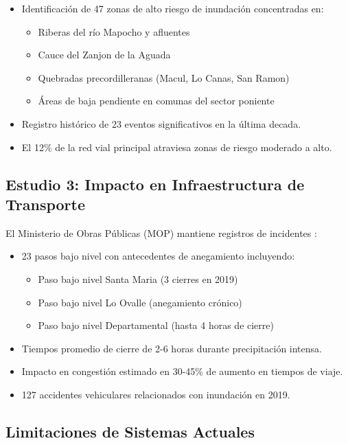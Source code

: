 \documentclass[conference]{IEEEtran}
\begin{document}
\begin{itemize}
    \item Identificación de 47 zonas de alto riesgo de inundación concentradas en:
    \begin{itemize}
        \item Riberas del río Mapocho y afluentes
        \item Cauce del Zanjon de la Aguada
        \item Quebradas precordilleranas (Macul, Lo Canas, San Ramon)
        \item Áreas de baja pendiente en comunas del sector poniente
    \end{itemize}
    \item Registro histórico de 23 eventos significativos en la última decada.
    \item El 12\% de la red vial principal atraviesa zonas de riesgo moderado a alto.
\end{itemize}

\subsection{Estudio 3: Impacto en Infraestructura de Transporte}

El Ministerio de Obras Públicas (MOP) mantiene registros de incidentes \citep{mop2019}:

\begin{itemize}
    \item 23 pasos bajo nivel con antecedentes de anegamiento incluyendo:
    \begin{itemize}
        \item Paso bajo nivel Santa Maria (3 cierres en 2019)
        \item Paso bajo nivel Lo Ovalle (anegamiento crónico)
        \item Paso bajo nivel Departamental (hasta 4 horas de cierre)
    \end{itemize}
    \item Tiempos promedio de cierre de 2-6 horas durante precipitación intensa.
    \item Impacto en congestión estimado en 30-45\% de aumento en tiempos de viaje.
    \item 127 accidentes vehiculares relacionados con inundación en 2019.
\end{itemize}

\subsection{Limitaciones de Sistemas Actuales}
\end{document}
